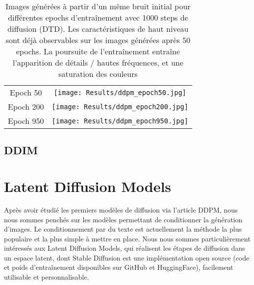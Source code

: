 \documentclass{article}
\begin{document}
\begin{adjustwidth}{-2cm}{-2cm}
\begin{minipage}{1.0\textwidth}
    \begin{table}[H]
        \centering
        \begin{tabularx}{400pt}{cc}
        Epoch 50 &
        \begin{minipage}{0.9\textwidth}
        \texttt{[image: Results/ddpm\_epoch50.jpg]}
        \end{minipage}\\[1.75cm]
        Epoch 200 &
        \begin{minipage}{0.9\textwidth}
        \texttt{[image: Results/ddpm\_epoch200.jpg]}
        \end{minipage}\\[1.75cm]
        Epoch 950 &
        \begin{minipage}{0.9\textwidth}
        \texttt{[image: Results/ddpm\_epoch950.jpg]}
        \end{minipage}\\
        \end{tabularx}
    \caption{Images générées à partir d'un même bruit initial pour différentes epochs d'entraînement avec 1000 steps de diffusion (DTD). Les caractéristiques de haut niveau sont déjà observables sur les images générées après 50 epochs. La poursuite de l'entraînement entraîne l'apparition de détails / hautes fréquences, et une saturation des couleurs}
    \end{table}
\end{minipage}
\end{adjustwidth}

\subsection{DDIM}



\clearpage
\section{Latent Diffusion Models}

Après avoir étudié les premiers modèles de diffusion via l'article DDPM, nous nous sommes penchés sur les modèles permettant de conditionner la génération d'images. Le conditionnement par du texte est actuellement la méthode la plus populaire et la plus simple à mettre en place. Nous nous sommes particulièrement intéressés aux Latent Diffusion Models, qui réalisent les étapes de diffusion dans un espace latent, dont Stable Diffusion est une implémentation open source (code et poids d'entraînement disponibles sur GitHub et HuggingFace), facilement utilisable et personnalisable.
\end{document}

